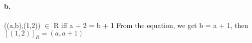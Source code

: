 \documentclass[11pt]{article}
\begin{document}
\paragraph{b.}
((a,b),(1,2)) $\in$ R iff a + 2 = b + 1 \newline \newline
From the equation, we get b = a + 1, then \newline \newline
$[(1,2)]_R = {(a,a + 1)}$
\end{document}
